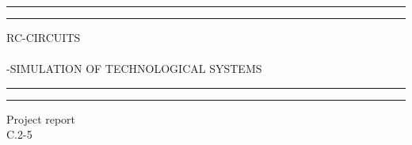 

\begin{titlepage} %

	\centering %
	
	\scshape %
	
	\vspace*{\baselineskip} %
	
	
	\rule{\textwidth}{1.6pt}\vspace*{-\baselineskip}\vspace*{2pt} %
	\rule{\textwidth}{0.4pt} %
	
	\vspace{0.75\baselineskip} %
	
	{\LARGE RC-CIRCUITS\\~\\\large -SIMULATION OF TECHNOLOGICAL SYSTEMS } %
	
	\vspace{0.75\baselineskip} %
	
	\rule{\textwidth}{0.4pt}\vspace*{-\baselineskip}\vspace{3.2pt} %
	\rule{\textwidth}{1.6pt} %
	
	\vspace{2\baselineskip} %
	
	
	\Large Project report\\\large C.2-5%
	
	\vspace*{3\baselineskip} %
	
	
	

\end{titlepage}
